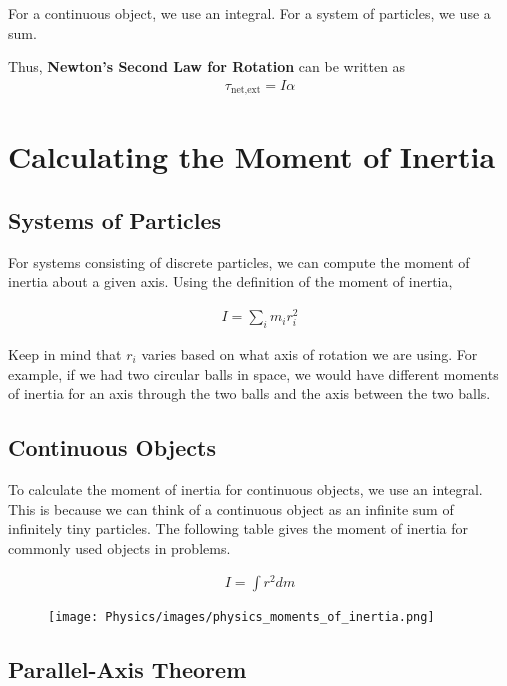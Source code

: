 \documentclass[11pt]{article}
\begin{document}
For a continuous object, we use an integral. For a system of particles, we use a sum.

Thus, \textbf{Newton's Second Law for Rotation} can be written as
\begin{align*}
    \tau_{\text{net,ext}} = I\alpha
\end{align*}

\section{Calculating the Moment of Inertia}

\subsection{Systems of Particles}

For systems consisting of discrete particles, we can compute the moment of inertia about a given axis. Using the definition of the moment of inertia,

\begin{align*}
    I = \sum_i m_i r_i^2 
\end{align*}

Keep in mind that $r_i$ varies based on what axis of rotation we are using. For example, if we had two circular balls in space, we would have different moments of inertia for an axis through the two balls and the axis between the two balls.

\subsection{Continuous Objects}
To calculate the moment of inertia for continuous objects, we use an integral. This is because we can think of a continuous object as an infinite sum of infinitely tiny particles. The following table gives the moment of inertia for commonly used objects in problems.

\begin{align*}
    I = \int r^2 dm 
\end{align*}

\begin{figure}[H]
    \centering
    \texttt{[image: Physics/images/physics\_moments\_of\_inertia.png]}
\end{figure}

\subsection{Parallel-Axis Theorem}
\end{document}
